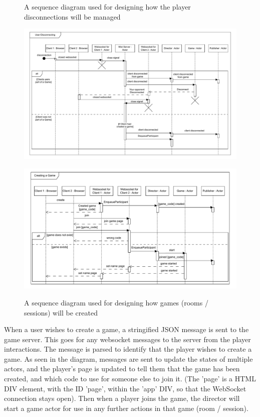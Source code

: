 \documentclass[]{project_interim}
\begin{document}
\begin{figure}[ht!]
  \centering
  \caption{A sequence diagram used for designing how the player disconnections will be managed}
  \vspace*{0.5cm}
  \includegraphics[width=\linewidth]{sequence_disconnecting}
  \label{fig: 3}
  \caption{A sequence diagram used for designing how games (rooms / sessions) will be created}
  \vspace*{0.5cm}
  \includegraphics[width=\linewidth]{sequence_creating}
  \label{fig: 4}
\end{figure}

When a user wishes to create a game, a stringified JSON message is sent to the game server.
This goes for any websocket messages to the server from the player interactions.
The message is parsed to identify that the player wishes to create a game. As seen in the diagram,
messages are sent to update the states of multiple actors, and the player's page is updated to tell
them that the game has been created, and which code to use for someone else to join it.
(The 'page' is a HTML DIV element, with the ID 'page', within the 'app' DIV, so that the WebSocket
connection stays open). Then when a player joins the game, the director will start
a game actor for use in any further actions in that game (room / session).
\end{document}
